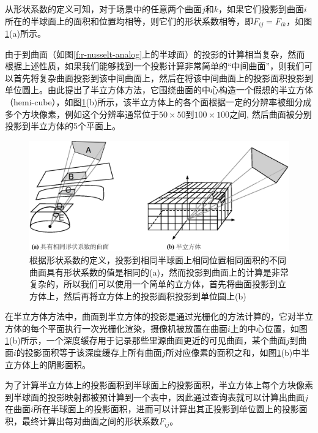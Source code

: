 从形状系数的定义可知，对于场景中的任意两个曲面$j$和$k$，如果它们投影到曲面$i$所在的半球面上的面积和位置均相等，则它们的形状系数相等，即$F_{ij}=F_{ik}$，如图\ref{f:r-hemicube}(a)所示。

由于到曲面（如图\ref{f:r-nusselt-analog}上的半球面）的投影的计算相当复杂，然而根据上述性质，如果我们能够找到一个投影计算非常简单的“中间曲面”，则我们可以首先将复杂曲面投影到该中间曲面上，然后在将该中间曲面上的投影面积投影到单位圆上。由此\cite{a:Thehemi-cube:aradiositysolutionforcomplexenvironments}提出了半立方体方法，它围绕曲面的中心构造一个假想的半立方体（hemi-cube），如图\ref{f:r-hemicube}(b)所示，该半立方体上的各个面根据一定的分辨率被细分成多个方块像素，例如这个分辨率通常位于$50\times 50$到$100\times 100$之间, 然后曲面被分别投影到半立方体的5个平面上。

\begin{figure}
	\includegraphics[width=1.\textwidth]{figures/r/hemi-cube}
	\caption{根据形状系数的定义，投影到相同半球面上相同位置相同面积的不同曲面具有形状系数的值是相同的(a)，然而投影到曲面上的计算是非常复杂的，所以我们可以使用一个简单的立方体，首先将曲面投影到立方体上，然后再将立方体上的投影面积投影到单位圆上(b)}
	\label{f:r-hemicube}
\end{figure}

在半立方体方法中，曲面到半立方体的投影是通过光栅化的方法计算的，它对半立方体的每个平面执行一次光栅化渲染，摄像机被放置在曲面$i$上的中心位置，如图\ref{f:r-hemicube}(b)所示，一个深度缓存用于记录那些里源曲面更近的可见曲面，某个曲面$j$到曲面$i$的投影面积等于该深度缓存上所有曲面$j$所对应像素的面积之和，如图\ref{f:r-hemicube}(b)中半立方体上的阴影面积。

为了计算半立方体上的投影面积到半球面上的投影面积，半立方体上每个方块像素到半球面的投影映射都被预计算到一个表中，因此通过查询表就可以计算出曲面$j$在曲面$i$所在半球面上的投影面积，进而可以计算出其正投影到单位圆上的投影面积，最终计算出每对曲面之间的形状系数$F_{ij}$。





